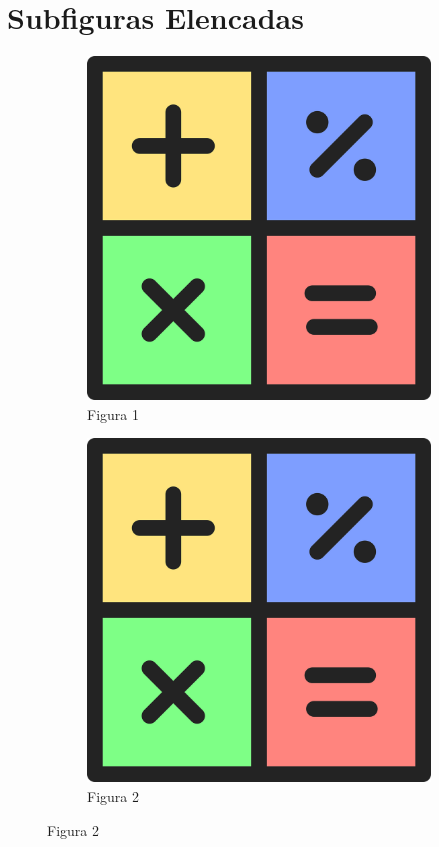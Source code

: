 \documentclass[12pt,a4paper]{article}
\begin{document}
\section{Subfiguras Elencadas}

\begin{figure}[H]
    \centering

    \begin{subfigure}[b]{0.45\textwidth}
        \centering
        \includegraphics[width=\textwidth]{figura}
        \caption{Figura 1}
        \label{fig:figuraa1}
    \end{subfigure}
    \hfill
    \begin{subfigure}[b]{0.45\textwidth}
        \centering
        \includegraphics[width=\textwidth]{figura}
        \caption{Figura 2}
        \label{fig:figuraa2}
    \end{subfigure}


\end{figure}
\end{document}
